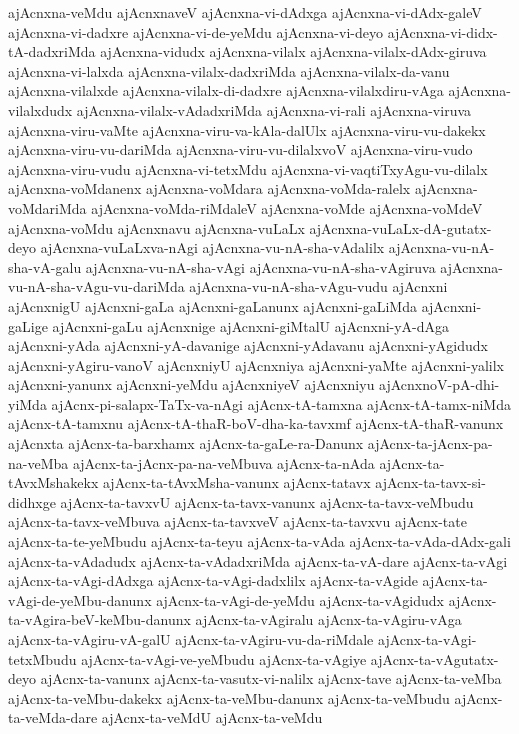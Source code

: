 {ajAcnxna-veMdu
ajAcnxnaveV
ajAcnxna-vi-dAdxga
ajAcnxna-vi-dAdx-galeV
ajAcnxna-vi-dadxre
ajAcnxna-vi-de-yeMdu
ajAcnxna-vi-deyo
ajAcnxna-vi-didx-tA-dadxriMda
ajAcnxna-vidudx
ajAcnxna-vilalx
ajAcnxna-vilalx-dAdx-giruva
ajAcnxna-vi-lalxda
ajAcnxna-vilalx-dadxriMda
ajAcnxna-vilalx-da-vanu
ajAcnxna-vilalxde
ajAcnxna-vilalx-di-dadxre
ajAcnxna-vilalxdiru-vAga
ajAcnxna-vilalxdudx
ajAcnxna-vilalx-vAdadxriMda
ajAcnxna-vi-rali
ajAcnxna-viruva
ajAcnxna-viru-vaMte
ajAcnxna-viru-va-kAla-dalUlx
ajAcnxna-viru-vu-dakekx
ajAcnxna-viru-vu-dariMda
ajAcnxna-viru-vu-dilalxvoV
ajAcnxna-viru-vudo
ajAcnxna-viru-vudu
ajAcnxna-vi-tetxMdu
ajAcnxna-vi-vaqtiTxyAgu-vu-dilalx
ajAcnxna-voMdanenx
ajAcnxna-voMdara
ajAcnxna-voMda-ralelx
ajAcnxna-voMdariMda
ajAcnxna-voMda-riMdaleV
ajAcnxna-voMde
ajAcnxna-voMdeV
ajAcnxna-voMdu
ajAcnxnavu
ajAcnxna-vuLaLx
ajAcnxna-vuLaLx-dA-gutatx-deyo
ajAcnxna-vuLaLxva-nAgi
ajAcnxna-vu-nA-sha-vAdalilx
ajAcnxna-vu-nA-sha-vA-galu
ajAcnxna-vu-nA-sha-vAgi
ajAcnxna-vu-nA-sha-vAgiruva
ajAcnxna-vu-nA-sha-vAgu-vu-dariMda
ajAcnxna-vu-nA-sha-vAgu-vudu
ajAcnxni
ajAcnxnigU
ajAcnxni-gaLa
ajAcnxni-gaLanunx
ajAcnxni-gaLiMda
ajAcnxni-gaLige
ajAcnxni-gaLu
ajAcnxnige
ajAcnxni-giMtalU
ajAcnxni-yA-dAga
ajAcnxni-yAda
ajAcnxni-yA-davanige
ajAcnxni-yAdavanu
ajAcnxni-yAgidudx
ajAcnxni-yAgiru-vanoV
ajAcnxniyU
ajAcnxniya
ajAcnxni-yaMte
ajAcnxni-yalilx
ajAcnxni-yanunx
ajAcnxni-yeMdu
ajAcnxniyeV
ajAcnxniyu
ajAcnxnoV-pA-dhi-yiMda
ajAcnx-pi-salapx-TaTx-va-nAgi
ajAcnx-tA-tamxna
ajAcnx-tA-tamx-niMda
ajAcnx-tA-tamxnu
ajAcnx-tA-thaR-boV-dha-ka-tavxmf
ajAcnx-tA-thaR-vanunx
ajAcnxta
ajAcnx-ta-barxhamx
ajAcnx-ta-gaLe-ra-Danunx
ajAcnx-ta-jAcnx-pa-na-veMba
ajAcnx-ta-jAcnx-pa-na-veMbuva
ajAcnx-ta-nAda
ajAcnx-ta-tAvxMshakekx
ajAcnx-ta-tAvxMsha-vanunx
ajAcnx-tatavx
ajAcnx-ta-tavx-si-didhxge
ajAcnx-ta-tavxvU
ajAcnx-ta-tavx-vanunx
ajAcnx-ta-tavx-veMbudu
ajAcnx-ta-tavx-veMbuva
ajAcnx-ta-tavxveV
ajAcnx-ta-tavxvu
ajAcnx-tate
ajAcnx-ta-te-yeMbudu
ajAcnx-ta-teyu
ajAcnx-ta-vAda
ajAcnx-ta-vAda-dAdx-gali
ajAcnx-ta-vAdadudx
ajAcnx-ta-vAdadxriMda
ajAcnx-ta-vA-dare
ajAcnx-ta-vAgi
ajAcnx-ta-vAgi-dAdxga
ajAcnx-ta-vAgi-dadxlilx
ajAcnx-ta-vAgide
ajAcnx-ta-vAgi-de-yeMbu-danunx
ajAcnx-ta-vAgi-de-yeMdu
ajAcnx-ta-vAgidudx
ajAcnx-ta-vAgira-beV-keMbu-danunx
ajAcnx-ta-vAgiralu
ajAcnx-ta-vAgiru-vAga
ajAcnx-ta-vAgiru-vA-galU
ajAcnx-ta-vAgiru-vu-da-riMdale
ajAcnx-ta-vAgi-tetxMbudu
ajAcnx-ta-vAgi-ve-yeMbudu
ajAcnx-ta-vAgiye
ajAcnx-ta-vAgutatx-deyo
ajAcnx-ta-vanunx
ajAcnx-ta-vasutx-vi-nalilx
ajAcnx-tave
ajAcnx-ta-veMba
ajAcnx-ta-veMbu-dakekx
ajAcnx-ta-veMbu-danunx
ajAcnx-ta-veMbudu
ajAcnx-ta-veMda-dare
ajAcnx-ta-veMdU
ajAcnx-ta-veMdu
}
